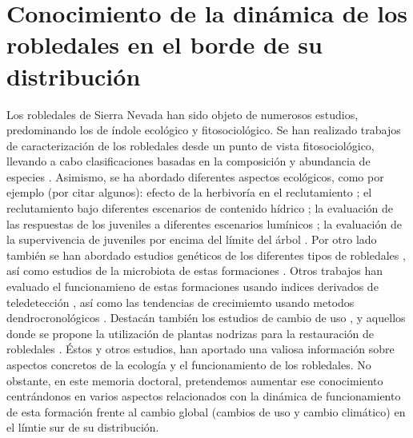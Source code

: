 \section{Conocimiento de la dinámica de los robledales en el borde de su distribución}\label{sec:intro:conocimiento}

Los robledales de Sierra Nevada han sido objeto de numerosos estudios, predominando los de índole ecológico y fitosociológico. Se han realizado trabajos de caracterización de los robledales desde un punto de vista fitosociológico, llevando a cabo clasificaciones basadas en la composición y abundancia de especies \autocites[\emph{e.g.}][]{MartinezParrasMoleroMesa1982EcologiaFitosociologia,Loriteetal2008PhytosociologicalReview, MelendoValle2000EstudioComparativo}. Asimismo, se ha abordado diferentes aspectos ecológicos, como por ejemplo (por citar algunos): efecto de la herbivoría en el reclutamiento \autocites[\emph{e.g.}][]{Gomez2003ImpactVertebrate,Barazaetal2004HerbivoryHas,Barazaetal2007InfluenciaCaracteristicas}; el reclutamiento bajo diferentes escenarios de contenido hídrico \autocites{Mendozaetal2009SeedingExperiment}; la evaluación de las respuestas de los juveniles a diferentes escenarios lumínicos \autocite{GomezAparicioetal2008OakSeedling}; la evaluación de la supervivencia de juveniles por encima del límite del árbol \autocites{Leverkusetal2015RestoringPresent}. Por otro lado también se han abordado estudios genéticos de los diferentes tipos de robledales \autocites[\emph{e.g.}][]{ValbuenaCarabanaGil2011EvaluacionEstructura,ValbuenaCarabanaGil2013GeneticResilience,ValbuenaCarabanaGil2017CentenaryCoppicing}, así como estudios de la microbiota de estas formaciones \autocites{CoboDiazetal2017TaxonomicFunctional,Lasaetal2019BacteriaEndosphere, Lasaetal2019MetabarcodingReveals}. Otros trabajos han evaluado el funcionamieno de estas formaciones usando indices derivados de teledetección \autocites{Dionisioetal2012IPoGEC,AlcarazSeguraetal2015CambiosProductividad,RequenaMulloretal2018AssessmentEcosystem}, así como las tendencias de crecimiemto usando metodos dendrocronológicos  \autocites{GeaIzquierdoCanellas2014LocalClimate,RubioCuadradoetal2018AbioticFactors}. Destacán también los estudios de cambio de uso \autocite{JimenezOlivenciaetal2015EvolucionUsos,CamachoOlmedoetal2002DinamicaEvolutiva}, y aquellos donde se propone la utilización de plantas nodrizas para la restauración de robledales \autocites{Castroetal2006RestoringQuercus,GomezAparicioetal2004ApplyingPlant}. 
Éstos y otros estudios, han aportado una valiosa información sobre aspectos concretos de la ecología y el funcionamiento de los robledales. No obstante, en este memoria doctoral, pretendemos aumentar ese conocimiento centrándonos en varios aspectos relacionados con la dinámica de funcionamiento de esta formación frente al cambio global (cambios de uso y cambio climático) en el límtie sur de su distribución.    

